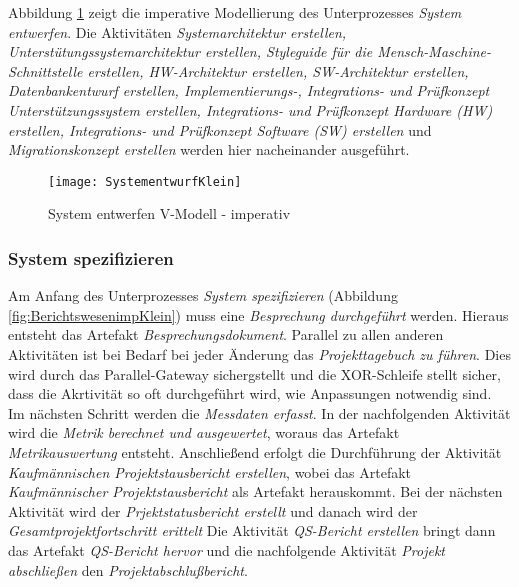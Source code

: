 Abbildung \ref{fig:SystementwurfKlein} zeigt die imperative Modellierung des Unterprozesses \textit{System entwerfen}.\newline
Die Aktivitäten \textit{Systemarchitektur erstellen, Unterstütungssystemarchitektur erstellen, Styleguide für die Mensch-Maschine-Schnittstelle erstellen, HW-Architektur erstellen, SW-Architektur erstellen, Datenbankentwurf erstellen, Implementierungs-, Integrations- und Prüfkonzept Unterstützungssystem erstellen, Integrations- und Prüfkonzept Hardware (HW) erstellen, Integrations- und Prüfkonzept Software (SW) erstellen} und \textit{Migrationskonzept erstellen} werden hier nacheinander ausgeführt.
\begin{figure}[!htbp]
\begin{center}
  \texttt{[image: SystementwurfKlein]} %
  \caption{System entwerfen V-Modell - imperativ}
  \label{fig:SystementwurfKlein}
\end{center}
\end{figure}


\subsubsection{System spezifizieren}


Am Anfang des Unterprozesses \textit{System spezifizieren} (Abbildung \ref{fig:BerichtswesenimpKlein}) muss eine \textit{Besprechung durchgeführt} werden. Hieraus entsteht das Artefakt \textit{Besprechungsdokument}.\newline
Parallel zu allen anderen Aktivitäten ist bei Bedarf bei jeder Änderung das \textit{Projekttagebuch zu führen}. Dies wird durch das Parallel-Gateway sichergstellt und die XOR-Schleife stellt sicher, dass die Akrtivität so oft durchgeführt wird, wie Anpassungen notwendig sind. \newline
Im nächsten Schritt werden die \textit{Messdaten erfasst}.\newline
In der nachfolgenden Aktivität wird die \textit{Metrik berechnet und ausgewertet}, woraus das Artefakt \textit{Metrikauswertung} entsteht.\newline
Anschließend erfolgt die Durchführung der Aktivität \textit{Kaufmännischen Projektstausbericht erstellen}, wobei das Artefakt \textit{Kaufmännischer Projektstausbericht} als Artefakt herauskommt.\newline
Bei der nächsten Aktivität wird der \textit{Prjektstatusbericht erstellt} und danach wird der \textit{Gesamtprojektfortschritt erittelt}\newline
Die Aktivität \textit{QS-Bericht erstellen} bringt dann das Artefakt \textit{QS-Bericht hervor} und die nachfolgende Aktivität \textit{Projekt abschließen} den \textit{Projektabschlußbericht}.

